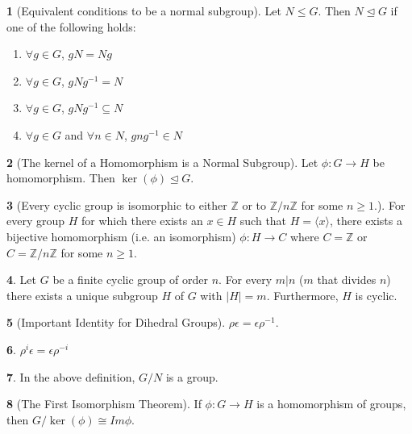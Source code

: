 \documentclass[12pt]{article}
\theoremstyle{definition}
\newtheorem{theorem}{\color{ForestGreen}{\textbf{Theorem}}}
\newcommand{\e}{\epsilon}
\begin{document}
\begin{theorem}[Equivalent conditions to be a normal subgroup]
Let $N \leq G$. Then $N \trianglelefteq G$ if one of the following holds:
\begin{enumerate}
\item $\forall g\in G$, $gN = Ng$
\item $\forall g\in G$, $gNg^{-1} = N$
\item $\forall g\in G$, $gNg^{-1} \subseteq N$
\item $\forall g\in G$ and $\forall n\in N$, $gng^{-1} \in N$
\end{enumerate}
\end{theorem}

\begin{theorem}[The kernel of a Homomorphism is a Normal Subgroup]
Let $\phi : G \to H$ be homomorphism. Then $\ker (\phi) \trianglelefteq G$.
\end{theorem}

\begin{theorem}[Every cyclic group is isomorphic to either $\mathbb{Z}$ or to $\mathbb{Z} / n \mathbb{Z}$ for some $n \geq 1$.] For every group $H$ for which there exists an $x \in H$ such that $H = \langle x \rangle$, there exists a bijective homomorphism (i.e. an isomorphism) $\phi : H \to C$ where $C = \mathbb{Z}$ or $C = \mathbb{Z} / n \mathbb{Z}$ for some $n \geq 1$.
\end{theorem}

\begin{theorem}
Let $G$ be a finite cyclic group of order $n$. For every $m | n$ ($m$ that divides $n$) there exists a unique subgroup $H$ of $G$ with $|H|=m$. Furthermore, $H$ is cyclic.
\end{theorem}

\begin{theorem}[Important Identity for Dihedral Groups]
$\rho \e = \e \rho^{-1}$.
\end{theorem}

\begin{theorem}
$\rho^i \e = \e \rho^{-i}$
\end{theorem}

\begin{theorem}
In the above definition, $G/N$ is a group.
\end{theorem}

\begin{theorem}[The First Isomorphism Theorem]
If $\phi:G\to H$ is a homomorphism of groups, then $G / \ker(\phi) \cong Im \phi$.
\end{theorem}
\end{document}
